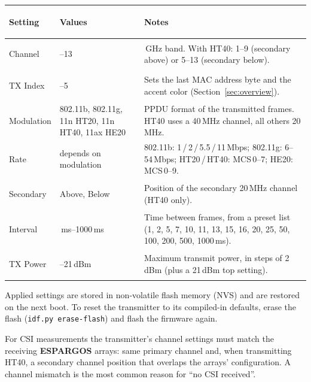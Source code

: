 \documentclass[a5paper, 10pt, twoside]{article}
\newcommand{\espname}{\textcolor{espgreen}{\textbf{ESPARGOS}}}
\begin{document}
\vspace{2pt}
{\footnotesize
\setlength{\tabcolsep}{5pt}
\renewcommand{\arraystretch}{1.3}
\begin{tabularx}{\linewidth}{@{}>{\bfseries\raggedright\arraybackslash}p{2.0cm}
  >{\raggedright\arraybackslash}p{3.2cm}
  >{\raggedright\arraybackslash}X@{}}
\toprule
\textbf{Setting} & \textbf{Values} & \textbf{Notes} \\
\midrule
Channel     & 1--13 &
  2.4\,GHz band. With HT40: 1--9 (secondary above) or 5--13 (secondary
  below). \\
TX Index    & 1--5 &
  Sets the last MAC address byte and the accent color
  (Section~\ref{sec:overview}). \\
Modulation  & 802.11b, 802.11g, 11n HT20, 11n HT40, 11ax HE20 &
  PPDU format of the transmitted frames. HT40 uses a 40\,MHz channel, all
  others 20\,MHz. \\
Rate        & depends on modulation &
  802.11b: 1\,/\,2\,/\,5.5\,/\,11\,Mbps; 802.11g: 6--54\,Mbps;
  HT20\,/\,HT40: MCS\,0--7; HE20: MCS\,0--9. \\
Secondary   & Above, Below &
  Position of the secondary 20\,MHz channel (HT40 only). \\
Interval    & 1\,ms--1000\,ms &
  Time between frames, from a preset list (1, 2, 5, 7, 10, 11, 13, 15, 16,
  20, 25, 50, 100, 200, 500, 1000\,ms). \\
TX Power    & 2--21\,dBm &
  Maximum transmit power, in steps of 2\,dBm (plus a 21\,dBm top setting). \\
\bottomrule
\end{tabularx}
}

\begin{notebox}
Applied settings are stored in non-volatile flash memory (NVS) and are
restored on the next boot. To reset the transmitter to its compiled-in
defaults, erase the flash (\texttt{idf.py erase-flash}) and flash the
firmware again.
\end{notebox}

\begin{warnbox}
For CSI measurements the transmitter's channel settings must match the
receiving \espname{} arrays: same primary channel and, when transmitting
HT40, a secondary channel position that overlaps the arrays' configuration.
A channel mismatch is the most common reason for ``no CSI received''.
\end{warnbox}

\clearpage
\end{document}
